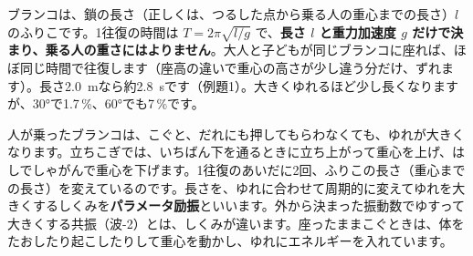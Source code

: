 ブランコは、鎖の長さ（正しくは、つるした点から乗る人の重心までの長さ）$l$ のふりこです。1往復の時間は $T=2\pi\sqrt{l/g}$ で、\textbf{長さ $l$ と重力加速度 $g$ だけで決まり、乗る人の重さにはよりません}。大人と子どもが同じブランコに座れば、ほぼ同じ時間で往復します（座高の違いで重心の高さが少し違う分だけ、ずれます）。長さ\qty{2.0}{m}なら約\qty{2.8}{s}です（例題1）。大きくゆれるほど少し長くなりますが、30°で1.7\,\%、60°でも7\,\%です。

\begin{phmodel}[ふりこ]
\end{phmodel}

\begin{phmijika}
人が乗ったブランコは、こぐと、だれにも押してもらわなくても、ゆれが大きくなります。立ちこぎでは、いちばん下を通るときに立ち上がって重心を上げ、はしでしゃがんで重心を下げます。1往復のあいだに2回、ふりこの長さ（重心までの長さ）を変えているのです。長さを、ゆれに合わせて周期的に変えてゆれを大きくするしくみを\textbf{パラメータ励振}といいます。外から決まった振動数でゆすって大きくする共振（波-2）とは、しくみが違います。座ったままこぐときは、体をたおしたり起こしたりして重心を動かし、ゆれにエネルギーを入れています。
\end{phmijika}

